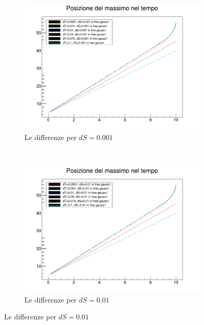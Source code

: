 \begin{figure}[ht]
	\centering
\begin{subfigure}[b]{0.49\textwidth}
\includegraphics[width=\textwidth]{IMG/v_g1_0001}
\caption[Differenze in 0.001]{Le differenze per $dS = 0.001$}
\end{subfigure}
~
\begin{subfigure}[b]{0.49\textwidth}
\includegraphics[width=\textwidth]{IMG/v_g1_001}
\caption[Differenze in 0.01]{Le differenze per $dS = 0.01$}
\end{subfigure}


\end{figure}
